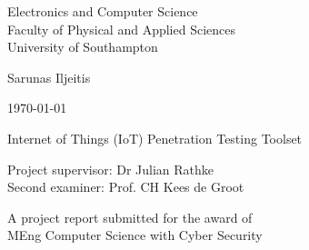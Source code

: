 \begin{titlepage}
   \begin{center}
       \vspace*{1cm}
 
       {\huge Electronics and Computer Science \\ 
       Faculty of Physical and Applied Sciences \\
       University of Southampton
       }
 
 
       \vspace{1.5cm}
 
       {\Large Sarunas Iljeitis}
       
       \vspace{0.2cm}
       
       \today
       
       \vspace{1cm}
       
       {\huge Internet of Things (IoT) Penetration Testing Toolset}
 
       \vfill
       
       {\Large
        Project supervisor: Dr Julian Rathke \\
       Second examiner:  Prof. CH Kees de Groot}
 
       \vspace{1.5cm}
 
       \Large
       A project report submitted for the award of \\
       MEng Computer Science with Cyber Security
       
       
       \vspace{0.8cm}
 
   \end{center}
\end{titlepage}